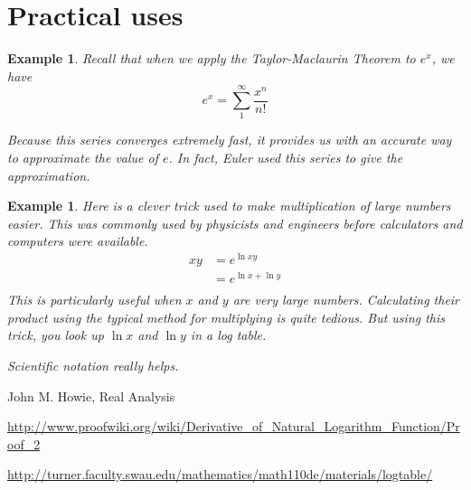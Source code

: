 \documentclass[12pt]{article}
\theoremstyle{mystyle}
\newtheorem{example}[thm]{Example}
\begin{document}
\section{Practical uses}

\begin{example}
  Recall that when we apply the Taylor-Maclaurin Theorem to $e^x$, we have
  $$ e^x = \sum_1^\infty \frac{x^n}{n!} $$
  
  Because this series converges extremely fast, it provides us with an accurate
  way to approximate the value of $e$. In fact, Euler used this series to give
  the approximation.
\end{example}


\begin{example}
  Here is a clever trick used to make multiplication of large numbers easier.
  This was commonly used by physicists and engineers before calculators and
  computers were available. 
  \begin{align*}
    xy &= e^{\ln xy} \\
       &= e^{\ln x + \ln y} \\
  \end{align*}
  This is particularly useful when $x$ and $y$ are very large numbers.
  Calculating their product using the typical method for multiplying is quite
  tedious. But using this trick, you look up $\ln x$ and $\ln y$ in a log table.

  Scientific notation really helps.
   
\end{example}


\begin{thebibliography}{10}

John M. Howie, Real Analysis

\url{http://www.proofwiki.org/wiki/Derivative_of_Natural_Logarithm_Function/Proof_2}

\url{http://turner.faculty.swau.edu/mathematics/math110de/materials/logtable/}
\end{thebibliography}
\end{document}
